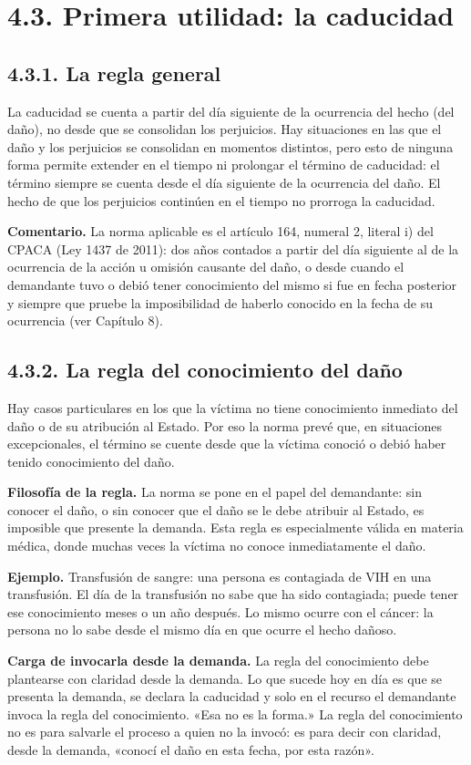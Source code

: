 \section{4.3. Primera utilidad: la caducidad}
\subsection{4.3.1. La regla general}
La caducidad se cuenta a partir del día siguiente de la ocurrencia del hecho (del daño), no desde que se consolidan los perjuicios. Hay situaciones en las que el daño y los perjuicios se consolidan en momentos distintos, pero esto de ninguna forma permite extender en el tiempo ni prolongar el término de caducidad: el término siempre se cuenta desde el día siguiente de la ocurrencia del daño. El hecho de que los perjuicios continúen en el tiempo no prorroga la caducidad.

\begin{comentario}
\textcolor[HTML]{8A6D3B}{\textbf{Comentario. }}La norma aplicable es el artículo 164, numeral 2, literal i) del CPACA (Ley 1437 de 2011): dos años contados a partir del día siguiente al de la ocurrencia de la acción u omisión causante del daño, o desde cuando el demandante tuvo o debió tener conocimiento del mismo si fue en fecha posterior y siempre que pruebe la imposibilidad de haberlo conocido en la fecha de su ocurrencia (ver Capítulo 8).
\end{comentario}
\subsection{4.3.2. La regla del conocimiento del daño}
Hay casos particulares en los que la víctima no tiene conocimiento inmediato del daño o de su atribución al Estado. Por eso la norma prevé que, en situaciones excepcionales, el término se cuente desde que la víctima conoció o debió haber tenido conocimiento del daño.

\textbf{Filosofía de la regla.} La norma se pone en el papel del demandante: sin conocer el daño, o sin conocer que el daño se le debe atribuir al Estado, es imposible que presente la demanda. Esta regla es especialmente válida en materia médica, donde muchas veces la víctima no conoce inmediatamente el daño.

\begin{ejemplo}
\textcolor[HTML]{4F6228}{\textbf{Ejemplo. }}Transfusión de sangre: una persona es contagiada de VIH en una transfusión. El día de la transfusión no sabe que ha sido contagiada; puede tener ese conocimiento meses o un año después. Lo mismo ocurre con el cáncer: la persona no lo sabe desde el mismo día en que ocurre el hecho dañoso.
\end{ejemplo}
\textbf{Carga de invocarla desde la demanda.} La regla del conocimiento debe plantearse con claridad desde la demanda. Lo que sucede hoy en día es que se presenta la demanda, se declara la caducidad y solo en el recurso el demandante invoca la regla del conocimiento. «Esa no es la forma.» La regla del conocimiento no es para salvarle el proceso a quien no la invocó: es para decir con claridad, desde la demanda, «conocí el daño en esta fecha, por esta razón».

